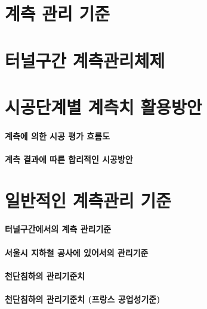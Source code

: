 \documentclass[12pt, a4paper, oneside]{book}
\let\stdsection\section
\renewcommand\section{\newpage\stdsection}
\begin{document}
	\section{계측 관리 기준}
	
	\section{터널구간 계측관리체제}
			
	\section{시공단계별 계측치 활용방안}


		\paragraph{계측에 의한 시공 평가 흐름도}
		
		\paragraph{계측 결과에 따른 합리적인 시공방안}

	\section{일반적인 계측관리 기준}

		\paragraph{터널구간에서의 계측 관리기준}
		
		\paragraph{서울시 지하철 공사에 있어서의 관리기준}
		
		\paragraph{천단침하의 관리기준치}

		\paragraph{천단침하의 관리기준치 (프랑스 공업성기준)}
		
\end{document}
